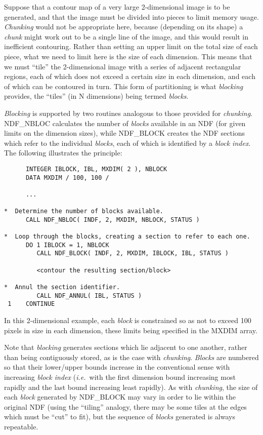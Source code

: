 \documentclass[twoside,11pt]{article}
\newcommand{\htmlref}[2]{#1}
\newcommand{\st}[1]{{\em{#1}}}
\begin{document}
Suppose that a contour map of a very large \mbox{2-dimensional} image is
to be generated, and that the image must be divided into pieces to limit
memory usage. \st{Chunking\/} would not be appropriate here, because
(depending on its shape) a \st{chunk\/} might work out to be a single
line of the image, and this would result in inefficient contouring.
Rather than setting an upper limit on the total size of each piece, what
we need to limit here is the size of each dimension. This means
that we must ``tile'' the 2-dimensional image with a series of adjacent
rectangular regions, each of which does not exceed a certain size in
each dimension, and each of which can be contoured in turn. This form of
partitioning is what \st{blocking\/} provides, the ``tiles'' (in N
dimensions) being termed \st{blocks}.

\st{Blocking\/} is supported by two routines analogous to those
provided for \st{chunking}. \htmlref{NDF\_NBLOC}{NDF_NBLOC} calculates
the number of \st{blocks\/} available in an NDF (for given limits on
the dimension sizes), 
while \htmlref{NDF\_BLOCK}{NDF_BLOCK} creates the NDF sections which refer to the individual
\st{blocks}, each of which is identified by a \st{block index}. The
following illustrates the principle:

\small
\begin{verbatim}
      INTEGER IBLOCK, IBL, MXDIM( 2 ), NBLOCK
      DATA MXDIM / 100, 100 /

      ...

*  Determine the number of blocks available.
      CALL NDF_NBLOC( INDF, 2, MXDIM, NBLOCK, STATUS )

*  Loop through the blocks, creating a section to refer to each one.
      DO 1 IBLOCK = 1, NBLOCK
         CALL NDF_BLOCK( INDF, 2, MXDIM, IBLOCK, IBL, STATUS )

         <contour the resulting section/block>

*  Annul the section identifier.
         CALL NDF_ANNUL( IBL, STATUS )
 1    CONTINUE
\end{verbatim}
\normalsize

In this 2-dimensional example, each \st{block\/} is constrained so as not to
exceed 100 pixels in size in each dimension, these limits being specified in the
MXDIM array.

Note that \st{blocking\/} generates sections which lie adjacent to one another,
rather than being contiguously stored, as is the case with
\st{chunking}. \st{Blocks\/} are numbered so that their lower/upper
bounds increase in the 
conventional sense with increasing \st{block index\/} (\st{i.e.}\ with the
first dimension bound increasing most rapidly and the last bound increasing
least rapidly). As with \st{chunking}, the size of each \st{block\/} generated
by NDF\_BLOCK may vary in order to lie within the original NDF (using the
``tiling'' analogy, there may be some tiles at the edges which must be ``cut''
to fit), but the sequence of \st{blocks\/} generated is always repeatable.
\end{document}
